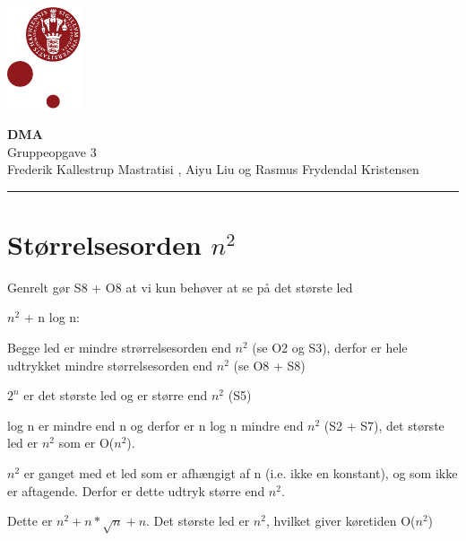 \documentclass[12pt, a4paper, hidelinks]{article}
\begin{document}
\begin{minipage}[b]{1.0\linewidth}
\includegraphics[height=30mm]{KULogo}

\vspace*{-16ex}
\begin{center}
    {\Large \bf DMA} \vspace*{1ex} \\
    {\large Gruppeopgave 3} \vspace*{1ex} \\
    {\large Frederik Kallestrup Mastratisi , Aiyu Liu og Rasmus Frydendal Kristensen}
\end{center}
\vspace*{-3pt}
{\color{KU-red}\hrule}
\end{minipage}
\vspace{2ex}

\tableofcontents \newpage

\section{Størrelsesorden $n^2$}
Genrelt gør S8 + O8 at vi kun behøver at se på det største led


\begin{labeling}{$n^2$ + n log n: }
\item [\pmb{n + log n:}] Begge led er mindre strørrelsesorden end $n^2$ (se O2 og S3), derfor er hele udtrykket mindre størrelsesorden end $n^2$ (se O8 + S8)
\item [\pmb{$n^2 + 2^n$:}] $2^n$ er det største led og er større end $n^2$ (S5)
\item [\pmb{$n^2$ + n log n:}] log n er mindre end n og derfor er n log n mindre end $n^2$ (S2 + S7), det største led er $n^2$ som er O($n^2$).
\item [\pmb{$n^2(3+\sqrt{n})$:}] $n^2$ er ganget med et led som er afhængigt af n (i.e. ikke en konstant), og som ikke er aftagende. Derfor er dette udtryk større end $n^2$.
\item [\pmb{$(n+\sqrt(n))^2$:}] Dette er $n^2+n*\sqrt{n}+n$. Det største led er $n^2$, hvilket giver køretiden  O($n^2$) 
\end{labeling}
\end{document}

